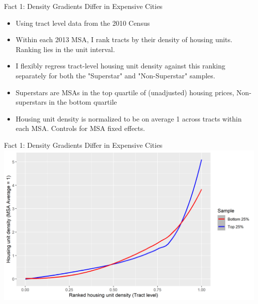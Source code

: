 \documentclass{beamer}
\theoremstyle{plain}
\begin{document}
\begin{frame}{Fact 1: Density Gradients Differ in Expensive Cities}
\begin{itemize}
	\itemsep1em
	\color{black}
	\item Using tract level data from the 2010 Census \pause
	\item Within each 2013 MSA, I rank tracts by their density of housing units. Ranking lies in the unit interval. \pause
	\item I flexibly regress tract-level housing unit density against this ranking separately for both the "Superstar" and "Non-Superstar" samples. \pause
	\item Superstars are MSAs in the top quartile of (unadjusted) housing prices, Non-superstars in the bottom quartile \pause
	\item Housing unit density is \color{red} normalized to be on average 1 \color{black} across tracts within each MSA. Controls for MSA fixed effects. 
\end{itemize}
\end{frame}

\begin{frame}{Fact 1: Density Gradients Differ in Expensive Cities}
\includegraphics[width=\textwidth]{tractdens_dist.png}
\end{frame}
\end{document}
